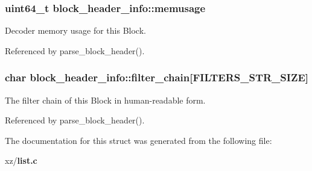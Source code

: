 \subsubsection[{memusage}]{\setlength{\rightskip}{0pt plus 5cm}uint64\-\_\-t block\-\_\-header\-\_\-info\-::memusage}\label{structblock__header__info_a88cb8006bb6751b3beb6fc3502157961}


Decoder memory usage for this Block. 



Referenced by parse\-\_\-block\-\_\-header().

\subsubsection[{filter\-\_\-chain}]{\setlength{\rightskip}{0pt plus 5cm}char block\-\_\-header\-\_\-info\-::filter\-\_\-chain[{\bf F\-I\-L\-T\-E\-R\-S\-\_\-\-S\-T\-R\-\_\-\-S\-I\-Z\-E}]}\label{structblock__header__info_a57a8b7bfb8338109e1cbc294aa1fa537}


The filter chain of this Block in human-\/readable form. 



Referenced by parse\-\_\-block\-\_\-header().



The documentation for this struct was generated from the following file\-:\begin{DoxyCompactItemize}
\item 
xz/{\bf list.\-c}\end{DoxyCompactItemize}
